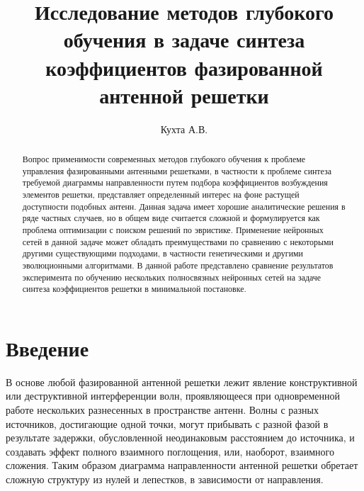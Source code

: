 \documentclass[nonacm, sigconf]{acmart}
\begin{document}
\title{Исследование методов глубокого обучения в задаче синтеза коэффициентов фазированной антенной решетки}

\author{Кухта А.В.}

\renewcommand{\shortauthors}{}

\begin{abstract}
Вопрос применимости современных методов глубокого обучения к проблеме управления фазированными антенными решетками, в частности к проблеме синтеза требуемой диаграммы направленности путем подбора коэффициентов возбуждения элементов решетки, представляет определенный интерес на фоне растущей доступности подобных антенн. Данная задача имеет хорошие аналитические решения в ряде частных случаев, но в общем виде считается сложной и формулируется как проблема оптимизации с поиском решений по эвристике. Применение нейронных сетей в данной задаче может обладать преимуществами по сравнению с некоторыми другими существующими подходами, в частности генетическими и другими эволюционными алгоритмами. В данной работе представлено сравнение результатов эксперимента по обучению нескольких полносвязных нейронных сетей на задаче синтеза коэффициентов решетки в минимальной постановке.
\end{abstract}


\maketitle

\section{Введение}

В основе любой фазированной антенной решетки лежит явление конструктивной или деструктивной интерференции волн, проявляющееся при одновременной работе нескольких разнесенных в пространстве антенн. Волны с разных источников, достигающие одной точки, могут прибывать с разной фазой в результате задержки, обусловленной неодинаковым расстоянием до источника, и создавать эффект полного взаимного поглощения, или, наоборот, взаимного сложения. Таким образом диаграмма направленности антенной решетки обретает сложную структуру из нулей и 
лепестков, в зависимости от направления.
\end{document}
